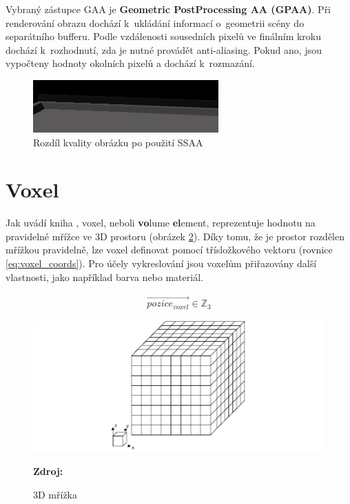 Vybraný zástupce GAA je \textbf{Geometric PostProcessing AA (GPAA)}. Při renderování obrazu dochází k~ukládání informací o~geometrii scény do separátního bufferu. Podle vzdálenosti sousedních pixelů ve finálním kroku dochází k~rozhodnutí, zda je nutné provádět anti-aliasing. Pokud ano, jsou vypočteny hodnoty okolních pixelů a dochází k~rozmazání.

\begin{figure}[H]
	\centering
	\includegraphics[scale=3]{obrazky-figures/ssaa_diff.png}
	\caption{Rozdíl kvality obrázku po použití SSAA}
	\label{fig:aliasing}
\end{figure}




\section{Voxel} \label{voxels}
Jak uvádí kniha \cite{gfx_principles_practice}, voxel, neboli \textbf{vo}lume \textbf{el}ement, reprezentuje hodnotu na pravidelné mřížce ve 3D prostoru (obrázek \ref{fig:3d_grid}). Díky tomu, že je prostor rozdělen mřížkou pravidelně, lze voxel definovat pomocí třísložkového vektoru (rovnice \ref{eq:voxel_coords}). Pro účely vykreslování jsou voxelům přiřazovány další vlastnosti, jako například barva nebo materiál.

\begin{equation} \label{eq:voxel_coords}
	\begin{gathered}
		\vec{pozice_{voxel}} \in \mathbb{Z}_3
	\end{gathered}
\end{equation}

\begin{figure}[H]
	\centering
	\includegraphics[scale=0.5]{obrazky-figures/3d_grid.png}
	\caption{3D mřížka}
	\textbf{Zdroj: }\cite{3d_grid_image}
	\label{fig:3d_grid}
\end{figure}

